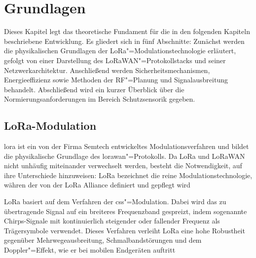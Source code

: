 
\chapter{Grundlagen}
\label{chap:grundlagen}
Dieses Kapitel legt das theoretische Fundament für die in den folgenden Kapiteln
beschriebene Entwicklung. Es gliedert sich in fünf Abschnitte: Zunächst werden die
physikalischen Grundlagen der LoRa"=Modulationstechnologie erläutert, gefolgt von
einer Darstellung des LoRaWAN"=Protokollstacks und seiner Netzwerkarchitektur.
Anschließend werden Sicherheitsmechanismen, Energieeffizienz sowie Methoden der
RF"=Planung und Signalausbreitung behandelt. Abschließend wird ein kurzer Überblick
über die Normierungsanforderungen im Bereich Schutzsensorik gegeben.

\section{LoRa-Modulation}
\label{sec:lora-physical}

\acrfull{lora} ist ein von der Firma Semtech entwickeltes Modulationsverfahren und bildet die physikalische Grundlage des 
\acrshort{lorawan}"=Protokolls. Da LoRa und LoRaWAN nicht unhäufig miteinander verwechselt werden, besteht die Notwendigkeit, auf ihre Unterschiede hinzuweisen: 
LoRa bezeichnet die reine Modulationstechnologie, währen
der von der LoRa Alliance definiert und gepflegt wird~%

\cite{akyildizWirelessSensorNetworks2010} %

LoRa basiert auf dem Verfahren der \acrfull{css}"=Modulation.
Dabei wird das zu übertragende Signal auf ein breiteres Frequenzband gespreizt, indem
sogenannte Chirps-Signale mit kontinuierlich steigender oder fallender Frequenz
als Trägersymbole verwendet. Dieses Verfahren verleiht LoRa eine hohe Robustheit
gegenüber Mehrwegeausbreitung, Schmalbandstörungen und dem Doppler"=Effekt, wie er
bei mobilen Endgeräten auftritt~%

